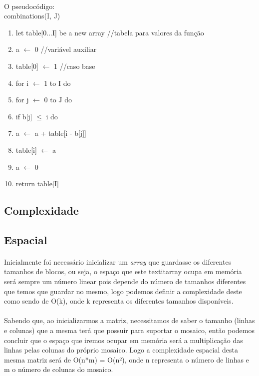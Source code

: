 \documentclass[12pt]{article}
\begin{document}
\paragraph{}
O pseudocódigo: 
\\ combinations(I, J)
\begin{enumerate}
	\item let table[0...I] be a new array //tabela para valores da função
	\item a $\leftarrow$ 0 //variável auxiliar
	\item table[0] $\leftarrow$ 1 //caso base
	\item for i $\leftarrow$ 1 to I do
	\item \hspace{0.5 cm} for j $\leftarrow$ 0 to J do
	\item \hspace{1 cm} if b[j] $\leq$ i do
	\item \hspace{1.5 cm} a $\leftarrow$ a + table[i - b[j]]
	\item \hspace{0.5 cm} table[i] $\leftarrow$ a
	\item \hspace{0.5 cm} a $\leftarrow$ 0
	\item return table[I]
\end{enumerate}


\newpage
\begin{center}
\section{Complexidade}
\end{center}
\subsection{Espacial}
\paragraph{}
Inicialmente foi necessário inicializar um \textit{array} que guardasse os diferentes tamanhos de blocos, ou seja, o espaço que este textit{array} ocupa em memória será sempre um número linear pois depende do número de tamanhos diferentes que temos que guardar no mesmo, logo podemos definir a complexidade deste como sendo de O(k), onde k representa os diferentes tamanhos disponíveis.
\paragraph{}
Sabendo que, ao inicializarmos a matriz, necessitamos de saber o tamanho (linhas e colunas) que a mesma terá que possuir para suportar o mosaico, então podemos concluir que o espaço que iremos ocupar em memória será a multiplicação das linhas pelas colunas do próprio mosaico. Logo a complexidade espacial desta mesma matriz será de O(n*m) = O(n²), onde n representa o número de linhas e m o número de colunas do mosaico.
\end{document}
